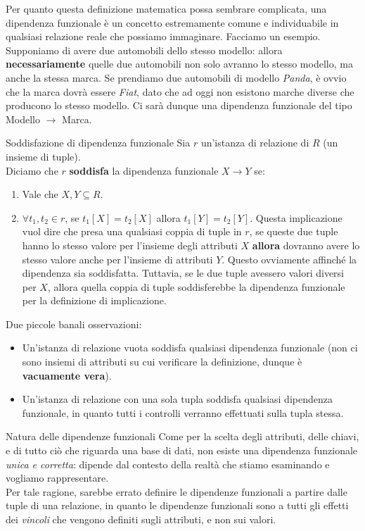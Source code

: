 \documentclass[12pt]{report}
\newcommand{\ra}{
	\rightarrow
}
\begin{document}
	Per quanto questa definizione matematica possa sembrare complicata, una dipendenza funzionale è un concetto estremamente comune e individuabile in qualsiasi relazione reale che possiamo immaginare. Facciamo un esempio. Supponiamo di avere due automobili dello stesso modello: allora \textbf{necessariamente} quelle due automobili non solo avranno lo stesso modello, ma anche la stessa marca. Se prendiamo due automobili di modello \textit{Panda}, è ovvio che la marca dovrà essere \textit{Fiat}, dato che ad oggi non esistono marche diverse che producono lo stesso modello. Ci sarà dunque una dipendenza funzionale del tipo Modello $\ra$ Marca.
	
	\begin{definizione}{Soddisfazione di dipendenza funzionale}{}
		Sia $r$ un'istanza di relazione di $R$ (un insieme di tuple).\\
		Diciamo che $r$ \textbf{soddisfa} la dipendenza funzionale $X \ra Y$ se:
		\begin{enumerate}
			\item Vale che $X, Y \subseteq R$.
			
			\item $\forall t_1, t_2 \in r$, se $t_1[X] = t_2[X]$ allora $t_1[Y] = t_2[Y]$. Questa implicazione vuol dire che presa una qualsiasi coppia di tuple in $r$, se queste due tuple hanno lo stesso valore per l'insieme degli attributi $X$ \textbf{allora} dovranno avere lo stesso valore anche per l'insieme di attributi $Y$. Questo ovviamente affinché la dipendenza sia soddisfatta. Tuttavia, se le due tuple avessero valori diversi per $X$, allora quella coppia di tuple soddisferebbe la dipendenza funzionale per la definizione di implicazione.
		\end{enumerate}
		
		Due piccole banali osservazioni:
		\begin{itemize}
			\item Un'istanza di relazione vuota soddisfa qualsiasi dipendenza funzionale (non ci sono insiemi di attributi su cui verificare la definizione, dunque è \textbf{vacuamente vera}).
			
			\item Un'istanza di relazione con una sola tupla soddisfa qualsiasi dipendenza funzionale, in quanto tutti i controlli verranno effettuati sulla tupla stessa.
		\end{itemize}
	\end{definizione}
	
	\begin{osservazione}{Natura delle dipendenze funzionali}{}
		Come per la scelta degli attributi, delle chiavi, e di tutto ciò che riguarda una base di dati, non esiste una dipendenza funzionale \textit{unica e corretta}: dipende dal contesto della realtà che stiamo esaminando e vogliamo rappresentare.\\
		Per tale ragione, sarebbe errato definire le dipendenze funzionali a partire dalle tuple di una relazione, in quanto le dipendenze funzionali sono a tutti gli effetti dei \textit{vincoli} che vengono definiti sugli attributi, e non sui valori.
	\end{osservazione}
	
\end{document}
